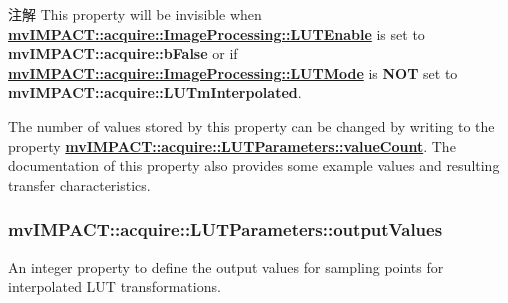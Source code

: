 \begin{DoxyNote}{注解}
This property will be invisible when {\bfseries \hyperlink{classmv_i_m_p_a_c_t_1_1acquire_1_1_image_processing_a7f8eb83578d97fde3405e6ae5d09e5c3}{mv\+I\+M\+P\+A\+C\+T\+::acquire\+::\+Image\+Processing\+::\+L\+U\+T\+Enable}} is set to {\bfseries mv\+I\+M\+P\+A\+C\+T\+::acquire\+::b\+False} or if {\bfseries \hyperlink{classmv_i_m_p_a_c_t_1_1acquire_1_1_image_processing_ae2f3059a3574e6a08a2d4348f1d5a152}{mv\+I\+M\+P\+A\+C\+T\+::acquire\+::\+Image\+Processing\+::\+L\+U\+T\+Mode}} is {\bfseries N\+O\+T} set to {\bfseries mv\+I\+M\+P\+A\+C\+T\+::acquire\+::\+L\+U\+Tm\+Interpolated}.
\end{DoxyNote}
The number of values stored by this property can be changed by writing to the property {\bfseries \hyperlink{classmv_i_m_p_a_c_t_1_1acquire_1_1_l_u_t_parameters_a490895560ff62d99203f9b9cb008c26d}{mv\+I\+M\+P\+A\+C\+T\+::acquire\+::\+L\+U\+T\+Parameters\+::value\+Count}}. The documentation of this property also provides some example values and resulting transfer characteristics. \hypertarget{classmv_i_m_p_a_c_t_1_1acquire_1_1_l_u_t_parameters_aa95b0ab8ca26f36f4bd7f9aa20a5b808}{
\subsubsection[{output\+Values}]{ mv\+I\+M\+P\+A\+C\+T\+::acquire\+::\+L\+U\+T\+Parameters\+::output\+Values}}\label{classmv_i_m_p_a_c_t_1_1acquire_1_1_l_u_t_parameters_aa95b0ab8ca26f36f4bd7f9aa20a5b808}


An integer property to define the output values for sampling points for interpolated L\+U\+T transformations. 

